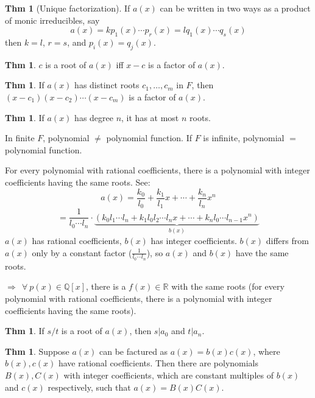 \documentclass{article}
\theoremstyle{definition}
\newtheorem{theorem}[definition]{Thm}
\begin{document}
\begin{theorem}[Unique factorization]
    If $a(x)$ can be written in two ways as a product of monic irreducibles, say
    $$a(x) = k p_1(x) \cdots p_r(x) = l q_1(x) \cdots q_s(x)$$
    then $k=l$, $r=s$, and $p_i(x) = q_j(x)$.
\end{theorem}

\begin{theorem}
    $c$ is a root of $a(x)$ iff $x - c$ is a factor of $a(x)$.
\end{theorem}
\begin{theorem}
    If $a(x)$ has distinct roots $c_1, \ldots, c_m$ in $F$, then $(x-c_1)(x-c_2)\cdots(x-c_m)$ is a factor of $a(x)$.
\end{theorem}

\begin{theorem}
    If $a(x)$ has degree $n$, it has at most $n$ roots.
\end{theorem}

In finite $F$, polynomial $\neq$ polynomial function. If $F$ is infinite, polynomial $=$ polynomial function.

For every polynomial with rational coefficients, there is a polynomial with integer coefficients having the same roots. See:
$$a(x) = \frac{k_0}{l_0} + \frac{k_1}{l_1} x + \cdots + \frac{k_n}{l_n} x^n$$
$$=\frac{1}{l_0 \cdots l_n} \cdot \underbrace{(k_0 l_1 \cdots l_n + k_1 l_0 l_2 \cdots l_n x + \cdots + k_n l_0 \cdots l_{n-1} x^n)}_{b(x)}$$
$a(x)$ has rational coefficients, $b(x)$ has integer coefficients. $b(x)$ differs from $a(x)$ only by a constant factor ($\frac{1}{l_0\cdots l_n}$), so $a(x)$ and $b(x)$ have the same roots.

$\Longrightarrow~~\forall~p(x) \in \mathbb{Q}[x]$, there is a $f(x) \in \mathbb{R}$ with the same roots (for every polynomial with rational coefficients, there is a polynomial with integer coefficients having the same roots).

\begin{theorem}
    If $s/t$ is a root of $a(x)$, then $s|a_0$ and $t|a_n$.
\end{theorem}

\begin{theorem}
    Suppose $a(x)$ can be factured as $a(x) = b(x)c(x)$, where $b(x), c(x)$ have rational coefficients. Then there are polynomials $B(x), C(x)$ with integer coefficients, which are constant multiples of $b(x)$ and $c(x)$ respectively, such that $a(x) = B(x)C(x)$.
\end{theorem}
\end{document}
